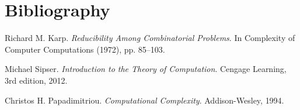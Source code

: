 \documentclass[11pt]{article}
\begin{document}
\newpage
\section*{Bibliography}

\begin{thebibliography}{9}

Richard M. Karp. 
\textit{Reducibility Among Combinatorial Problems}. 
In Complexity of Computer Computations (1972), pp. 85–103.

Michael Sipser. 
\textit{Introduction to the Theory of Computation}. 
Cengage Learning, 3rd edition, 2012.

Christos H. Papadimitriou. 
\textit{Computational Complexity}. 
Addison-Wesley, 1994.

\end{thebibliography}
\end{document}
